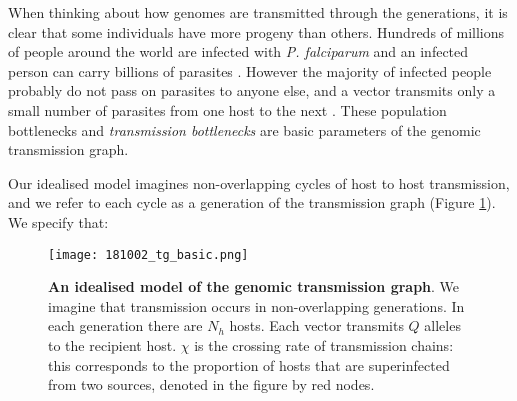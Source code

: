 \documentclass[_main.tex]{subfiles}
\begin{document}
When thinking about how genomes are transmitted through the generations, it is clear that some individuals have more progeny than others.  Hundreds of millions of people around the world are infected with \textit{P. falciparum} and an infected person can carry billions of parasites \cite{WHO2022}.  However the majority of infected people probably do not pass on parasites to anyone else, and a vector transmits only a small number of parasites from one host to the next \cite{Graumans2020}.  These population bottlenecks and \textit{transmission bottlenecks} are basic parameters of the genomic transmission graph.

Our idealised model imagines non-overlapping cycles of host to host transmission, and we refer to each cycle as a generation of the transmission graph (Figure \ref{fig:graph_2}).  We specify that: 

\begin{figure}[ht]
\centering
\texttt{[image: 181002\_tg\_basic.png]}
\caption{\textbf{An idealised model of the genomic transmission graph}.  We imagine that transmission occurs in non-overlapping generations.  In each generation there are $N_h$ hosts.  Each vector transmits $Q$ alleles to the recipient host.  $\chi$ is the crossing rate of transmission chains: this corresponds to the proportion of hosts that are superinfected from two sources, denoted in the figure by red nodes.}
\label{fig:graph_2}
\end{figure}
\end{document}
